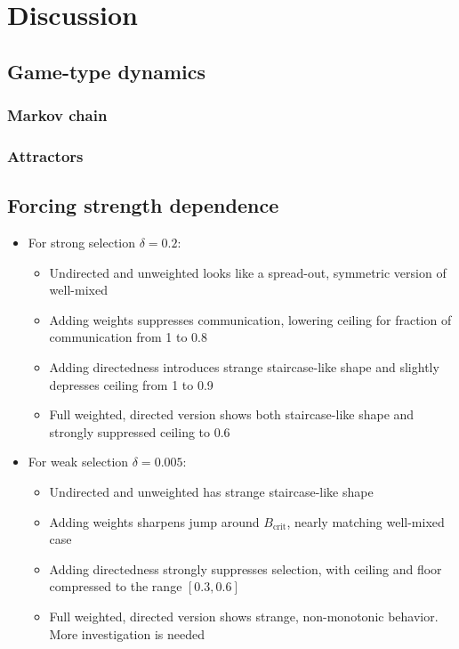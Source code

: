 \documentclass[pdflatex,lineno,referee,sn-mathphys-ay]{class/sn-jnl}
\begin{document}
\section{Discussion}
\subsection{Game-type dynamics}
\subsubsection{Markov chain}
\subsubsection{Attractors}

\subsection{Forcing strength dependence}
\begin{itemize}
  \item For strong selection $\delta = 0.2$:
  \begin{itemize}
    \item Undirected and unweighted looks like a spread-out, symmetric
      version of well-mixed
    \item Adding weights suppresses communication, lowering ceiling
      for fraction of communication from \num{1} to \num{0.8}
    \item Adding directedness introduces strange staircase-like shape
      and slightly depresses ceiling from \num{1} to \num{0.9}
    \item Full weighted, directed version shows both staircase-like
      shape and strongly suppressed ceiling to \num{0.6}
  \end{itemize}
  \item For weak selection $\delta = 0.005$:
  \begin{itemize}
    \item Undirected and unweighted has strange staircase-like shape
    \item Adding weights sharpens jump around $B_\text{crit}$, nearly
      matching well-mixed case
    \item Adding directedness strongly suppresses selection, with
      ceiling and floor compressed to the range $[0.3,0.6]$
    \item Full weighted, directed version shows strange, non-monotonic
      behavior. More investigation is needed
  \end{itemize}
\end{itemize}
\end{document}

